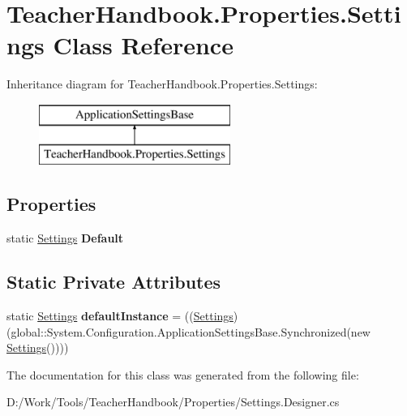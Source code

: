 \hypertarget{class_teacher_handbook_1_1_properties_1_1_settings}{}\section{Teacher\+Handbook.\+Properties.\+Settings Class Reference}
\label{class_teacher_handbook_1_1_properties_1_1_settings}
Inheritance diagram for Teacher\+Handbook.\+Properties.\+Settings\+:\begin{figure}[H]
\begin{center}
\leavevmode
\includegraphics[height=2.000000cm]{d0/d4b/class_teacher_handbook_1_1_properties_1_1_settings}
\end{center}
\end{figure}
\subsection*{Properties}
\begin{DoxyCompactItemize}
\item 
\mbox{\label{class_teacher_handbook_1_1_properties_1_1_settings_a7c06e1129e2b621773a8243e3ff15641}} 
static \mbox{\hyperlink{class_teacher_handbook_1_1_properties_1_1_settings}{Settings}} {\bfseries Default}
\end{DoxyCompactItemize}
\subsection*{Static Private Attributes}
\begin{DoxyCompactItemize}
\item 
\mbox{\label{class_teacher_handbook_1_1_properties_1_1_settings_a0ab4c8518be984ba2f07b4553ab289f2}} 
static \mbox{\hyperlink{class_teacher_handbook_1_1_properties_1_1_settings}{Settings}} {\bfseries default\+Instance} = ((\mbox{\hyperlink{class_teacher_handbook_1_1_properties_1_1_settings}{Settings}})(global\+::\+System.\+Configuration.\+Application\+Settings\+Base.\+Synchronized(new \mbox{\hyperlink{class_teacher_handbook_1_1_properties_1_1_settings}{Settings}}())))
\end{DoxyCompactItemize}


The documentation for this class was generated from the following file\+:\begin{DoxyCompactItemize}
\item 
D\+:/\+Work/\+Tools/\+Teacher\+Handbook/\+Properties/Settings.\+Designer.\+cs\end{DoxyCompactItemize}
